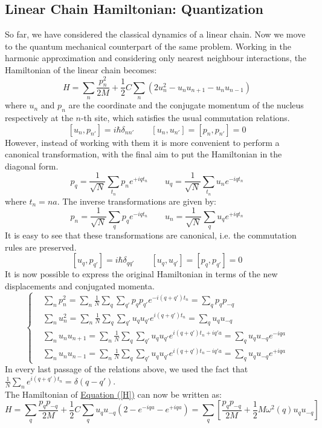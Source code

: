 \documentclass[10.75pt,a4paper,openright,bottom=2cm]{article}
\newcommand{\RN}[1]{%
  \textup{\uppercase\expandafter{\romannumeral#1}}%
}
\begin{document}
\subsection{Linear Chain Hamiltonian: \RN{1} Quantization}
So far, we have considered the classical dynamics of a linear chain. Now we move to the quantum mechanical counterpart of the same problem. Working in the harmonic approximation and considering only nearest neighbour interactions, the Hamiltonian of the linear chain becomes:
\begin{equation}
\label{H}
H=\sum_n\frac{p_n^2}{2M}+\frac{1}{2}C\sum_n(2u_n^2-u_nu_{n+1}-u_nu_{n-1})
\end{equation}
where $u_n$ and $p_n$ are the coordinate and the conjugate momentum of the nucleus respectively at the $n$-th site, which satisfies the usual commutation relations.
\[
[u_n,p_{n'}]=i\hbar\delta_{nn'} \qquad [u_n,u_{n'}]=[p_n,p_{n'}]=0
\]
However, instead of working with them it is more convenient to perform a canonical transformation, with the final aim to put the Hamiltonian in the diagonal form.
\[
p_q=\frac{1}{\sqrt{N}}\sum_{t_n}p_ne^{+iqt_n} \qquad u_q=\frac{1}{\sqrt{N}}\sum_{t_n}u_ne^{-iqt_n}
\]
where $t_n=na$. The inverse transformations are given by:
\[
p_n=\frac{1}{\sqrt{N}}\sum_qp_qe^{-iqt_n} \qquad u_n=\frac{1}{\sqrt{N}}\sum_qu_qe^{+iqt_n}
\]
It is easy to see that these transformations are canonical, i.e. the commutation rules are preserved.
\[
[u_q,p_{q'}]=i\hbar\delta_{qq'} \qquad [u_q,u_{q'}]=[p_q,p_{q'}]=0
\]
It is now possible to express the original Hamiltonian in terms of the new displacements and conjugated momenta.
\[
\left\{
\begin{aligned}
&\sum_np_n^2=\sum_n\frac{1}{N}\sum_q\sum_{q'}p_qp_{q'}e^{-i(q+q')t_n}=\sum_qp_qp_{-q}\\
&\sum_nu_n^2=\sum_n\frac{1}{N}\sum_q\sum_{q'}u_qu_{q'}e^{i(q+q')t_n}=\sum_qu_qu_{-q}\\
&\sum_nu_nu_{n+1}=\sum_n\frac{1}{N}\sum_q\sum_{q'}u_qu_{q'}e^{i(q+q')t_n+iq'a}=\sum_qu_qu_{-q}e^{-iqa}\\
&\sum_nu_nu_{n-1}=\sum_n\frac{1}{N}\sum_q\sum_{q'}u_qu_{q'}e^{i(q+q')t_n-iq'a}=\sum_qu_qu_{-q}e^{+iqa}
\end{aligned}
\right.
\]
In every last passage of the relations above, we used the fact that $\frac{1}{N}\sum_ne^{i(q+q')t_n}=\delta(q-q')$.\\
The Hamiltonian of \hyperref[H]{Equation (\ref{H})} can now be written as:
\begin{equation}
\label{H1}
H=\sum_q\frac{p_qp_{-q}}{2M}+\frac{1}{2}C\sum_qu_qu_{-q}(2-e^{-iqa }-e^{+iqa})=\sum_q\left[\frac{p_qp_{-q}}{2M}+\frac{1}{2}M\omega^2(q)u_qu_{-q}\right]
\end{equation}
\end{document}
